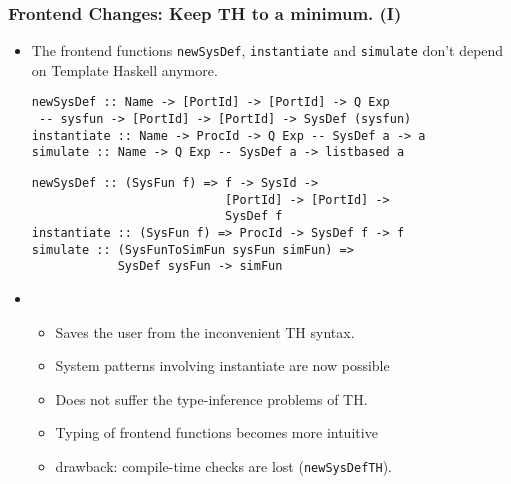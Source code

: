\documentclass{beamer}
\begin{document}
\begin{frame}[fragile]
  \frametitle{Frontend Changes: Keep TH to a minimum. (I)}
  \begin{itemize}
  \item<1-> The frontend functions \texttt{newSysDef},
    \texttt{instantiate} and \texttt{simulate} don't depend on
    Template Haskell anymore.

\begin{lstlisting}
newSysDef :: Name -> [PortId] -> [PortId] -> Q Exp
 -- sysfun -> [PortId] -> [PortId] -> SysDef (sysfun)
instantiate :: Name -> ProcId -> Q Exp -- SysDef a -> a
simulate :: Name -> Q Exp -- SysDef a -> listbased a 
\end{lstlisting}
\begin{lstlisting}
newSysDef :: (SysFun f) => f -> SysId -> 
                           [PortId] -> [PortId] ->
                           SysDef f
instantiate :: (SysFun f) => ProcId -> SysDef f -> f
simulate :: (SysFunToSimFun sysFun simFun) => 
            SysDef sysFun -> simFun
\end{lstlisting}

\item<2->     
  \begin{itemize}
  \item Saves the user from the inconvenient TH syntax.
  \item System patterns involving instantiate are now possible
  \item Does not suffer the type-inference problems of TH.
  \item Typing of frontend functions becomes more intuitive
  \item \alert{drawback}: compile-time checks are lost (\texttt{newSysDefTH}).
  \end{itemize}
\end{itemize}
\end{frame}
\end{document}
